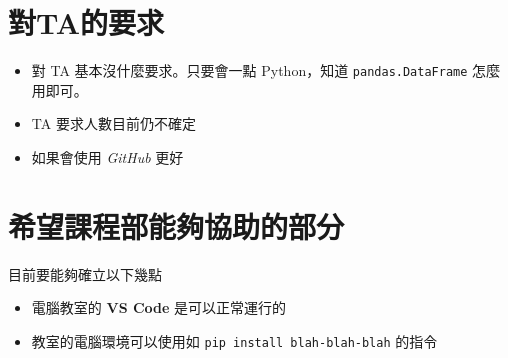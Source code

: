 \documentclass{beamer}
\newcommand{\code}[1]{\texttt{\textcolor{pinky}{#1}}}
\begin{document}
\section{對TA的要求}
\begin{frame}
  \begin{itemize}
  \item 對 TA 基本沒什麼要求。只要會一點 Python，知道 \code{pandas.DataFrame} 怎麼用即可。
  \item TA 要求人數目前仍不確定
  \item 如果會使用 \textit{GitHub} 更好
  \end{itemize}
\end{frame}
\section{希望課程部能夠協助的部分}
\begin{frame}
  目前要能夠確立以下幾點  
  \begin{itemize}
    \item 電腦教室的 \textbf{VS Code} 是可以正常運行的
    \item 教室的電腦環境可以使用如 \code{pip install blah-blah-blah} 的指令\footnotemark
  \end{itemize}
\end{frame}
\end{document}
